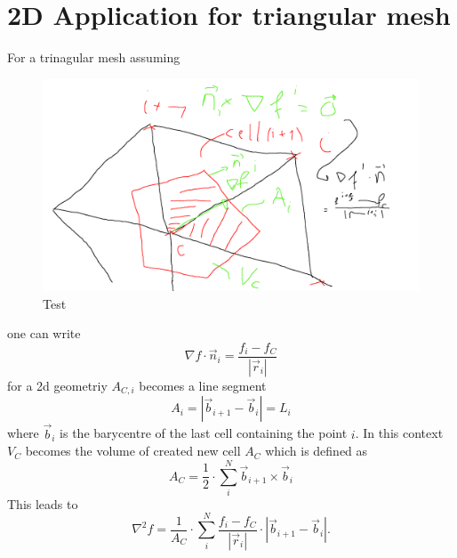 \section{2D Application for triangular mesh}
For a trinagular mesh assuming
\begin{figure}[ht]
    \label{fig:rod_heat_transfer}
    \centering
    \includegraphics[width=0.8\linewidth]{draft.png}
    \caption{Test}
\end{figure}
one can write
\begin{equation}
  \nabla f \cdot \vec{n}_i = \frac{f_{i} - f_C}{|\vec{r}_{i}|}
\end{equation}
for a 2d geometriy $A_{C, i}$ becomes a line segment
\begin{equation}
  A_{i} = |\vec{b}_{i + 1} - \vec{b}_{i}| = L_i
\end{equation}
where $\vec{b}_i$ is the barycentre of the last cell containing the point $i$.
In this context $V_C$ becomes the volume of created new cell $A_C$ which is defined as
\begin{equation}
  A_C = \frac{1}{2} \cdot \sum_i^N  \vec{b}_{i + 1} \times \vec{b}_{i}
\end{equation}
This leads to
\begin{equation}
  \nabla^2 f = \frac{1}{A_C} \cdot \sum_i^N \frac{f_{i} - f_C}{|\vec{r}_{i}|} \cdot |\vec{b}_{i + 1} - \vec{b}_{i}| .
\end{equation}
